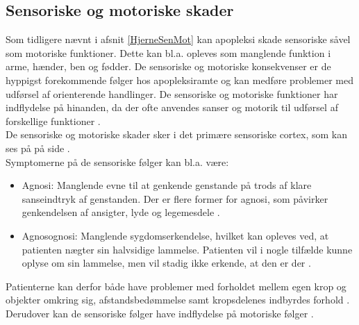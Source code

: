 \subsection{Sensoriske og motoriske skader} %
Som tidligere nævnt i afsnit \ref{HjerneSenMot} kan apopleksi skade sensoriske såvel som motoriske funktioner. Dette kan bl.a. opleves som manglende funktion i arme, hænder, ben og fødder. De sensoriske og motoriske konsekvenser er de hyppigst forekommende følger hos apopleksiramte og kan medføre problemer med udførsel af orienterende handlinger. \cite{Kruuse2015a,DSfA2009}  De sensoriske og motoriske funktioner har indflydelse på hinanden, da der ofte anvendes sanser og motorik til udførsel af forskellige funktioner \cite{Nichols1997}.  \\
De sensoriske og motoriske skader sker i det primære sensoriske cortex, som kan ses på  på side \pageref{Enc} .\\

\noindent Symptomerne på de sensoriske følger kan bl.a. være:
\begin{itemize}
  \item Agnosi: Manglende evne til at genkende genstande på trods af klare sanseindtryk af genstanden. Der er flere former for agnosi, som påvirker genkendelsen af ansigter, lyde og legemesdele \cite{Redaktionen2015}. 
 \item Agnosognosi: Manglende sygdomserkendelse, hvilket kan opleves ved, at patienten nægter sin halvsidige lammelse. Patienten vil i nogle tilfælde kunne oplyse om sin lammelse, men vil stadig ikke erkende, at den er der \cite{Pedersen1999}.
\end{itemize}
Patienterne kan derfor både have problemer med forholdet mellem egen krop og objekter omkring sig, afstandsbedømmelse samt kropsdelenes indbyrdes forhold \cite{Kruuse2015a,DSfA2009}. Derudover kan de sensoriske følger have indflydelse på motoriske følger \cite{Nichols1997}. \\

